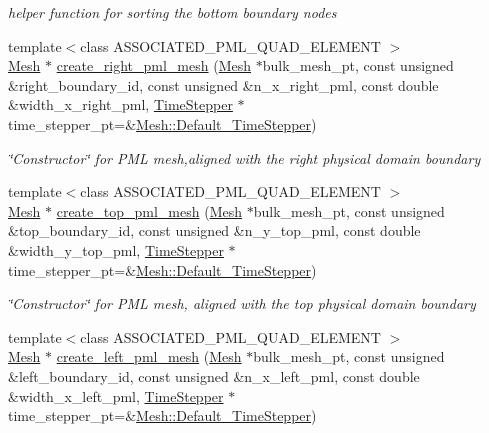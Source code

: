 \begin{DoxyCompactItemize}
\begin{DoxyCompactList}\small\item\em helper function for sorting the bottom boundary nodes \end{DoxyCompactList}\item 
{\footnotesize template$<$class A\+S\+S\+O\+C\+I\+A\+T\+E\+D\+\_\+\+P\+M\+L\+\_\+\+Q\+U\+A\+D\+\_\+\+E\+L\+E\+M\+E\+NT $>$ }\\\hyperlink{classoomph_1_1Mesh}{Mesh} $\ast$ \hyperlink{namespaceoomph_1_1TwoDimensionalPMLHelper_aefa58c9106ac3bee876a0bff81ab1a64}{create\+\_\+right\+\_\+pml\+\_\+mesh} (\hyperlink{classoomph_1_1Mesh}{Mesh} $\ast$bulk\+\_\+mesh\+\_\+pt, const unsigned \&right\+\_\+boundary\+\_\+id, const unsigned \&n\+\_\+x\+\_\+right\+\_\+pml, const double \&width\+\_\+x\+\_\+right\+\_\+pml, \hyperlink{classoomph_1_1TimeStepper}{Time\+Stepper} $\ast$time\+\_\+stepper\+\_\+pt=\&\hyperlink{classoomph_1_1Mesh_a12243d0fee2b1fcee729ee5a4777ea10}{Mesh\+::\+Default\+\_\+\+Time\+Stepper})
\begin{DoxyCompactList}\small\item\em \char`\"{}\+Constructor\char`\"{} for P\+ML mesh,aligned with the right physical domain boundary \end{DoxyCompactList}\item 
{\footnotesize template$<$class A\+S\+S\+O\+C\+I\+A\+T\+E\+D\+\_\+\+P\+M\+L\+\_\+\+Q\+U\+A\+D\+\_\+\+E\+L\+E\+M\+E\+NT $>$ }\\\hyperlink{classoomph_1_1Mesh}{Mesh} $\ast$ \hyperlink{namespaceoomph_1_1TwoDimensionalPMLHelper_a5f19139e8145fb29caf9be94b1909ed1}{create\+\_\+top\+\_\+pml\+\_\+mesh} (\hyperlink{classoomph_1_1Mesh}{Mesh} $\ast$bulk\+\_\+mesh\+\_\+pt, const unsigned \&top\+\_\+boundary\+\_\+id, const unsigned \&n\+\_\+y\+\_\+top\+\_\+pml, const double \&width\+\_\+y\+\_\+top\+\_\+pml, \hyperlink{classoomph_1_1TimeStepper}{Time\+Stepper} $\ast$time\+\_\+stepper\+\_\+pt=\&\hyperlink{classoomph_1_1Mesh_a12243d0fee2b1fcee729ee5a4777ea10}{Mesh\+::\+Default\+\_\+\+Time\+Stepper})
\begin{DoxyCompactList}\small\item\em \char`\"{}\+Constructor\char`\"{} for P\+ML mesh, aligned with the top physical domain boundary \end{DoxyCompactList}\item 
{\footnotesize template$<$class A\+S\+S\+O\+C\+I\+A\+T\+E\+D\+\_\+\+P\+M\+L\+\_\+\+Q\+U\+A\+D\+\_\+\+E\+L\+E\+M\+E\+NT $>$ }\\\hyperlink{classoomph_1_1Mesh}{Mesh} $\ast$ \hyperlink{namespaceoomph_1_1TwoDimensionalPMLHelper_acc70ea22db897a5e20676d8136759308}{create\+\_\+left\+\_\+pml\+\_\+mesh} (\hyperlink{classoomph_1_1Mesh}{Mesh} $\ast$bulk\+\_\+mesh\+\_\+pt, const unsigned \&left\+\_\+boundary\+\_\+id, const unsigned \&n\+\_\+x\+\_\+left\+\_\+pml, const double \&width\+\_\+x\+\_\+left\+\_\+pml, \hyperlink{classoomph_1_1TimeStepper}{Time\+Stepper} $\ast$time\+\_\+stepper\+\_\+pt=\&\hyperlink{classoomph_1_1Mesh_a12243d0fee2b1fcee729ee5a4777ea10}{Mesh\+::\+Default\+\_\+\+Time\+Stepper})

\end{DoxyCompactItemize}

